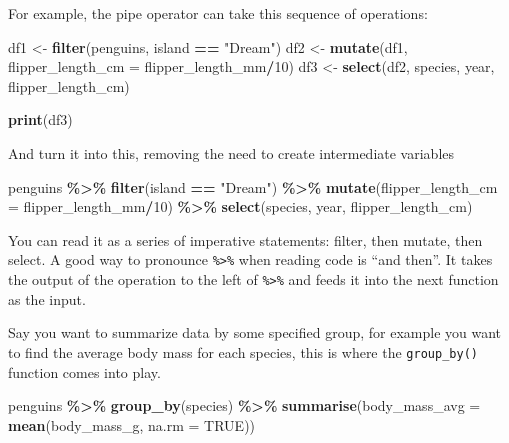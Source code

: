 \documentclass[
]{book}
\newenvironment{Shaded}{\begin{snugshade}}{\end{snugshade}}
\newcommand{\AttributeTok}[1]{\textcolor[rgb]{0.13,0.29,0.53}{#1}}
\newcommand{\ConstantTok}[1]{\textcolor[rgb]{0.56,0.35,0.01}{#1}}
\newcommand{\DecValTok}[1]{\textcolor[rgb]{0.00,0.00,0.81}{#1}}
\newcommand{\FunctionTok}[1]{\textcolor[rgb]{0.13,0.29,0.53}{\textbf{#1}}}
\newcommand{\NormalTok}[1]{#1}
\newcommand{\OtherTok}[1]{\textcolor[rgb]{0.56,0.35,0.01}{#1}}
\newcommand{\SpecialCharTok}[1]{\textcolor[rgb]{0.81,0.36,0.00}{\textbf{#1}}}
\newcommand{\StringTok}[1]{\textcolor[rgb]{0.31,0.60,0.02}{#1}}
\begin{document}
For example, the pipe operator can take this sequence of operations:

\begin{Shaded}
\begin{Highlighting}[]
\NormalTok{df1 }\OtherTok{\textless{}{-}} \FunctionTok{filter}\NormalTok{(penguins, island }\SpecialCharTok{==} \StringTok{"Dream"}\NormalTok{)}
\NormalTok{df2 }\OtherTok{\textless{}{-}} \FunctionTok{mutate}\NormalTok{(df1, }\AttributeTok{flipper\_length\_cm =}\NormalTok{ flipper\_length\_mm}\SpecialCharTok{/}\DecValTok{10}\NormalTok{)}
\NormalTok{df3 }\OtherTok{\textless{}{-}} \FunctionTok{select}\NormalTok{(df2, species, year, flipper\_length\_cm)}

\FunctionTok{print}\NormalTok{(df3)}
\end{Highlighting}
\end{Shaded}

And turn it into this, removing the need to create intermediate variables

\begin{Shaded}
\begin{Highlighting}[]
\NormalTok{penguins }\SpecialCharTok{\%\textgreater{}\%} 
  \FunctionTok{filter}\NormalTok{(island }\SpecialCharTok{==} \StringTok{"Dream"}\NormalTok{) }\SpecialCharTok{\%\textgreater{}\%} 
  \FunctionTok{mutate}\NormalTok{(}\AttributeTok{flipper\_length\_cm =}\NormalTok{ flipper\_length\_mm}\SpecialCharTok{/}\DecValTok{10}\NormalTok{) }\SpecialCharTok{\%\textgreater{}\%} 
  \FunctionTok{select}\NormalTok{(species, year, flipper\_length\_cm)}
\end{Highlighting}
\end{Shaded}

You can read it as a series of imperative statements: filter, then mutate, then select. A good way to pronounce \texttt{\%\textgreater{}\%} when reading code is ``and then''. It takes the output of the operation to the left of \texttt{\%\textgreater{}\%} and feeds it into the next function as the input.

Say you want to summarize data by some specified group, for example you want to find the average body mass for each species, this is where the \texttt{group\_by()} function comes into play.

\begin{Shaded}
\begin{Highlighting}[]
\NormalTok{penguins }\SpecialCharTok{\%\textgreater{}\%} 
  \FunctionTok{group\_by}\NormalTok{(species) }\SpecialCharTok{\%\textgreater{}\%} 
  \FunctionTok{summarise}\NormalTok{(}\AttributeTok{body\_mass\_avg =} \FunctionTok{mean}\NormalTok{(body\_mass\_g, }\AttributeTok{na.rm =} \ConstantTok{TRUE}\NormalTok{))}
\end{Highlighting}
\end{Shaded}
\end{document}
